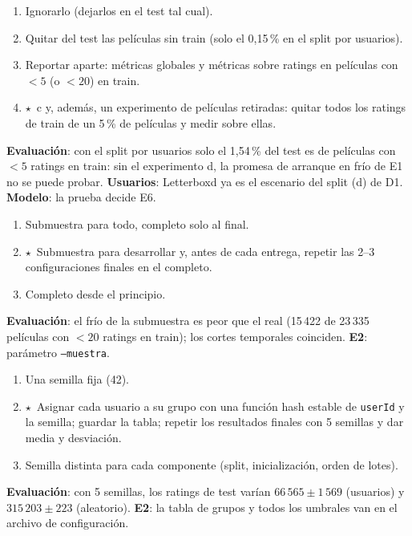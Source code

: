 \documentclass[a4paper,11pt]{article}
\newcommand{\rec}{\ensuremath{\star}}
\begin{document}
\begin{enumerate}[label=\alph*)]
  \item Ignorarlo (dejarlos en el test tal cual).
  \item Quitar del test las películas sin train (solo el 0,15\,\% en el split por usuarios).
  \item Reportar aparte: métricas globales y métricas sobre ratings en películas con $<5$ (o $<20$) en train.
  \item \rec\ c y, además, un experimento de películas retiradas: quitar todos los ratings de train de un 5\,\% de películas y medir sobre ellas.
\end{enumerate}
\textbf{Evaluación}: con el split por usuarios solo el 1,54\,\% del test es de películas con $<5$ ratings en train: sin el experimento d, la promesa
de arranque en frío de E1 no se puede probar. \textbf{Usuarios}: Letterboxd ya es el escenario del split (d) de D1. \textbf{Modelo}: la prueba decide E6.

\begin{enumerate}[label=\alph*)]
  \item Submuestra para todo, completo solo al final.
  \item \rec\ Submuestra para desarrollar y, antes de cada entrega, repetir las 2--3 configuraciones finales en el completo.
  \item Completo desde el principio.
\end{enumerate}
\textbf{Evaluación}: el frío de la submuestra es peor que el real (15\,422 de 23\,335 películas con $<20$ ratings en train); los cortes
temporales coinciden. \textbf{E2}: parámetro \texttt{--muestra}.

\begin{enumerate}[label=\alph*)]
  \item Una semilla fija (42).
  \item \rec\ Asignar cada usuario a su grupo con una función hash estable de \texttt{userId} y la semilla; guardar la tabla; repetir los resultados finales con 5 semillas y dar media y desviación.
  \item Semilla distinta para cada componente (split, inicialización, orden de lotes).
\end{enumerate}
\textbf{Evaluación}: con 5 semillas, los ratings de test varían $66\,565\pm1\,569$ (usuarios) y $315\,203\pm223$ (aleatorio). \textbf{E2}: la tabla de grupos y
todos los umbrales van en el archivo de configuración.
\end{document}
